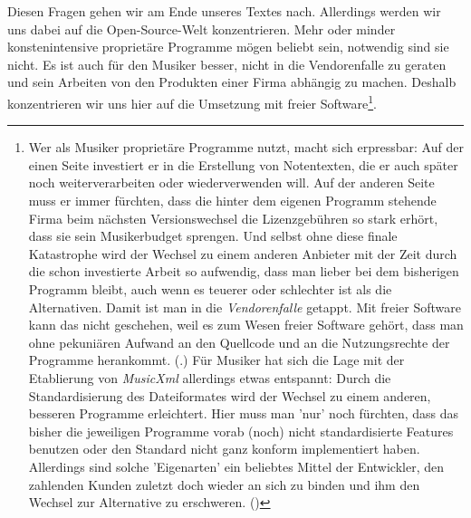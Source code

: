 Diesen Fragen gehen wir am Ende unseres Textes nach. Allerdings werden wir uns
dabei auf die Open-Source-Welt konzentrieren. Mehr oder minder konstenintensive
proprietäre Programme mögen beliebt sein, notwendig sind sie nicht. Es ist auch
für den Musiker besser, nicht in die Vendorenfalle zu geraten und sein Arbeiten
von den Produkten einer Firma abhängig zu machen. Deshalb konzentrieren wir uns
hier auf die Umsetzung mit freier Software\footnote{Wer als Musiker proprietäre
Programme nutzt, macht sich erpressbar: Auf der einen Seite investiert er in die
Erstellung von Notentexten, die er auch später noch weiterverarbeiten oder
wiederverwenden will. Auf der anderen Seite muss er immer fürchten, dass die
hinter dem eigenen Programm stehende Firma beim nächsten Versionswechsel die
Lizenzgebühren so stark erhört, dass sie sein Musikerbudget sprengen. Und selbst
ohne diese finale Katastrophe wird der Wechsel zu einem anderen Anbieter mit der
Zeit durch die schon investierte Arbeit so aufwendig, dass man lieber bei dem
bisherigen Programm bleibt, auch wenn es teuerer oder schlechter ist als die
Alternativen. Damit ist man in die \emph{Vendorenfalle} getappt. Mit freier
Software kann das nicht geschehen, weil es zum Wesen freier Software gehört,
dass man ohne pekuniären Aufwand an den Quellcode und an die Nutzungsrechte der
Programme herankommt. (\cite[vgl. dazu][\nopage wp]{FSF2018a}.) 
Für Musiker hat sich die Lage mit der Etablierung von \emph{MusicXml} allerdings etwas
entspannt: Durch die Standardisierung des Dateiformates wird der Wechsel zu
einem anderen, besseren Programme erleichtert. Hier muss man 'nur' noch
fürchten, dass das bisher die jeweiligen Programme vorab (noch) nicht
standardisierte Features benutzen oder den Standard nicht ganz konform
implementiert haben. Allerdings sind solche 'Eigenarten' ein beliebtes Mittel
der Entwickler, den zahlenden Kunden zuletzt doch wieder an sich zu binden und
ihm den Wechsel zur Alternative zu erschweren. (\cite[Zur Lizenzierung von
MusicXml vgl. auch][\nopage wp.]{WpedMusicXML2018a})}.

